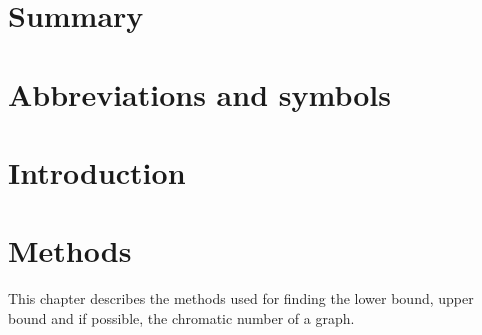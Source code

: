 \documentclass[a4paper]{report}
\begin{document}
	

	\chapter*{Summary}
	
	\tableofcontents
	
	\chapter*{Abbreviations and symbols}
	
	\chapter{Introduction}

	
	\chapter{Methods}
	This chapter describes the methods used for finding the lower bound, upper bound and if possible, the chromatic number of a graph. 
\end{document}
